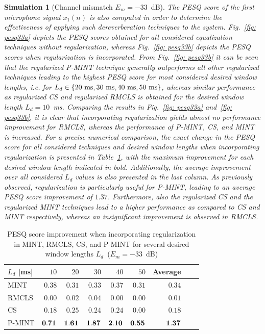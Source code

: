 \documentclass[10pt]{IEEEtran}
\newtheorem{simulation}{Simulation}
\begin{document}
\begin{simulation}[Channel mismatch $E_m=-33$~dB]
The PESQ score of the first microphone signal $x_1(n)$ is also computed in order to determine the effectiveness of applying such dereverberation techniques to the system.
Fig.~\ref{fig: pesq33a} depicts the PESQ scores obtained for all considered equalization techniques without regularization, whereas Fig.~\ref{fig: pesq33b} depicts the PESQ scores when regularization is incorporated.
From Fig.~\ref{fig: pesq33b} it can be seen that the regularized P-MINT technique generally outperforms all other regularized techniques leading to the highest PESQ score for most considered desired window lengths, i.e. for $L_d \in \{20~{\rm ms}, 30~{\rm ms}, 40~{\rm ms}, 50~{\rm ms} \}$, whereas similar performance as regularized CS and regularized RMCLS is obtained for the desired window length $L_d = 10$~ms.
Comparing the results in Fig.~\ref{fig: pesq33a} and~\ref{fig: pesq33b}, it is clear that incorporating regularization yields almost no performance improvement for RMCLS, whereas the performance of P-MINT, CS, and MINT is increased.
For a precise numerical comparison, the exact change in the PESQ score for all considered techniques and desired window lengths when incorporating regularization is presented in Table~\ref{tbl: pesq1}, with the maximum improvement for each desired window length indicated in bold.
Additionally, the average improvement over all considered $L_d$ values is also presented in the last column.
As previously observed, regularization is particularly useful for P-MINT, leading to an average PESQ score improvement of $1.37$.
Furthermore, also the regularized CS and the regularized MINT techniques lead to a higher performance as compared to CS and MINT respectively, whereas an insignificant improvement is observed in RMCLS.
\end{simulation}
\begin{table}[t]
\centering
\caption{PESQ score improvement when incorporating regularization in MINT, RMCLS, CS, and P-MINT for several desired window lengths $L_d$~($E_m = -33$~dB)}
\label{tbl: pesq1}
\begin{tabular}{|l|r|r|r|r|r|r|r|r|}
\hline
$L_d$ [ms] & $10$ & $20$ & $30$ & $40$ & $50$ & Average  \\
\hline
MINT & $0.38$ & $0.31$ & $0.33$ & $0.37$ & $0.31$ & $0.34$ \\
\hline
RMCLS & $0.00$ & $0.02$ & $0.04$ & $0.00$ & $0.00$ & $0.01$ \\
\hline
CS & $0.18$ & $0.25$ & $0.24$ & $0.24$ & $0.00$ & $0.18$ \\
\hline
P-MINT & $\bf{0.71}$ & $\bf{1.61}$ & $\bf{1.87}$ & $\bf{2.10}$ & $\bf{0.55}$ & $\bf{1.37}$ \\
\hline
\end{tabular}

\end{table}
\end{document}

